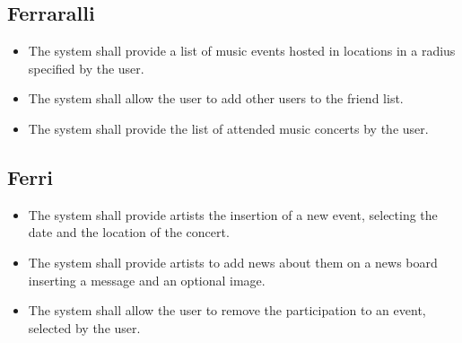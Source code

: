 \documentclass[11pt,a4paper]{article}
\begin{document}
\subsection{Ferraralli}
\begin{itemize}
\item The system shall provide a list of music events hosted in locations in a radius specified by the user.
\item The system shall allow the user to add other users to the friend list.
\item The system shall provide the list of attended music concerts by the user.
\end{itemize}
\subsection{Ferri}
\begin{itemize}
\item The system shall provide artists the insertion of a new event, selecting the date and the location of the concert.
\item The system shall provide artists to add news about them on a news board inserting a message and an optional image.
\item The system shall allow the user to remove the participation to an event, selected by the user.
\end{itemize}
\end{document}
